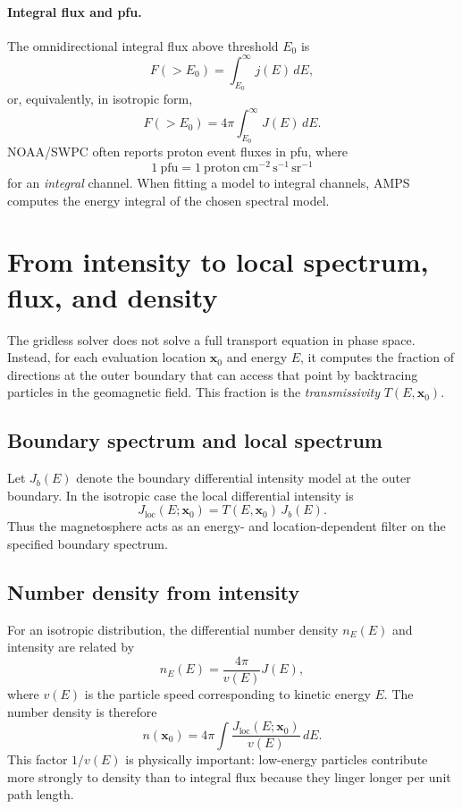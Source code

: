 \documentclass[11pt]{article}
\begin{document}
\paragraph{Integral flux and pfu.}
The omnidirectional integral flux above threshold $E_0$ is
\begin{equation}
  F(>E_0)=\int_{E_0}^{\infty} j(E)\,dE,
\end{equation}
or, equivalently, in isotropic form,
\begin{equation}
  F(>E_0)=4\pi\int_{E_0}^{\infty} J(E)\,dE.
\end{equation}
NOAA/SWPC often reports proton event fluxes in pfu, where
\begin{equation}
  1~\text{pfu}=1~\text{proton}~\text{cm}^{-2}\,\text{s}^{-1}\,\text{sr}^{-1}
\end{equation}
for an \emph{integral} channel. When fitting a model to integral channels, AMPS
computes the energy integral of the chosen spectral model.

\section{From intensity to local spectrum, flux, and density}
The gridless solver does not solve a full transport equation in phase space.
Instead, for each evaluation location $\bm{x}_0$ and energy $E$, it computes the
fraction of directions at the outer boundary that can access that point by
backtracing particles in the geomagnetic field. This fraction is the
\emph{transmissivity} $T(E,\bm{x}_0)$.

\subsection{Boundary spectrum and local spectrum}
Let $J_b(E)$ denote the boundary differential intensity model at the outer
boundary. In the isotropic case the local differential intensity is
\begin{equation}
  J_{\mathrm{loc}}(E;\bm{x}_0)=T(E,\bm{x}_0)\,J_b(E).
  \label{eq:Jloc_iso}
\end{equation}
Thus the magnetosphere acts as an energy- and location-dependent filter on the
specified boundary spectrum.

\subsection{Number density from intensity}
For an isotropic distribution, the differential number density $n_E(E)$ and
intensity are related by
\begin{equation}
  n_E(E)=\frac{4\pi}{v(E)}J(E),
\end{equation}
where $v(E)$ is the particle speed corresponding to kinetic energy $E$. The
number density is therefore
\begin{equation}
  n(\bm{x}_0)=4\pi\int \frac{J_{\mathrm{loc}}(E;\bm{x}_0)}{v(E)}\,dE.
  \label{eq:density_def}
\end{equation}
This factor $1/v(E)$ is physically important: low-energy particles contribute
more strongly to density than to integral flux because they linger longer per
unit path length.
\end{document}
